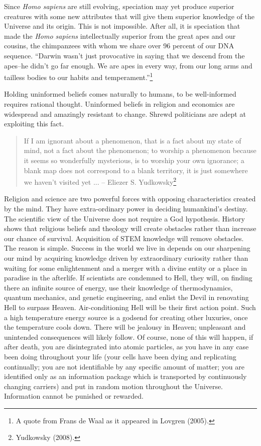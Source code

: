 \begin{multicols}{2}
Since \textit{Homo sapiens} are still evolving, speciation may yet produce superior creatures with some new attributes that will give them superior knowledge of the Universe and its origin. This is not impossible. After all, it is speciation that made the \textit{Homo sapiens} intellectually superior from the great apes and our cousins, the chimpanzees with whom we share over 96 percent of our DNA sequence. “Darwin wasn't just provocative in saying that we descend from the apes--he didn't go far enough. We are apes in every way, from our long arms and tailless bodies to our habits and temperament.”\footnote{A quote from Frans de Waal as it appeared in Lovgren (2005).}

Holding uninformed beliefs comes naturally to humans, to be well-informed requires rational thought. Uninformed beliefs in religion and economics are widespread and amazingly resistant to change. Shrewd politicians are adept at exploiting this fact.
\smallskip

\begin{quote}
If I am ignorant about a phenomenon, that is a fact about my state of mind, not a fact about the phenomenon; to worship a phenomenon because it seems so wonderfully mysterious, is to worship your own ignorance; a blank map does not correspond to a blank territory, it is just somewhere we haven't visited yet ... -- Eliezer S. Yudkowsky\footnote{Yudkowsky (2008).}
\end{quote}
\smallskip

Religion and science are two powerful forces with opposing characteristics created by the mind. They have extra-ordinary power in deciding humankind's destiny. The scientific view of the Universe does not require a God hypothesis. History shows that religious beliefs and theology will create obstacles rather than increase our chance of survival. Acquisition of STEM knowledge will remove obstacles. The reason is simple. Success in the world we live in depends on our sharpening our mind by acquiring knowledge driven by extraordinary curiosity rather than waiting for some enlightenment and a merger with a divine entity or a place in paradise in the afterlife. If scientists are condemned to Hell, they will, on finding there an infinite source of energy, use their knowledge of thermodynamics, quantum mechanics, and genetic engineering, and enlist the Devil in renovating Hell to surpass Heaven. Air-conditioning Hell will be their first action point. Such a high temperature energy source is a godsend for creating other luxuries, once the temperature cools down. There will be jealousy in Heaven; unpleasant and unintended consequences will likely follow. Of course, none of this will happen, if after death, you are disintegrated into atomic particles, as you have in any case been doing throughout your life (your cells have been dying and replicating continually; you are not identifiable by any specific amount of matter; you are identified only as an information package which is transported by continuously changing carriers) and put in random motion throughout the Universe. Information cannot be punished or rewarded.


\end{multicols}

